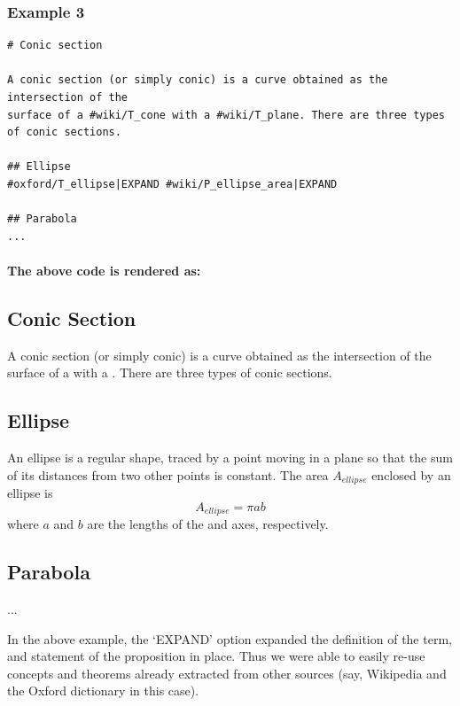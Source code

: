 \documentclass[a4paper]{article}
\begin{document}
\subsubsection*{Example 3}

\begin{verbatim}
# Conic section

A conic section (or simply conic) is a curve obtained as the intersection of the
surface of a #wiki/T_cone with a #wiki/T_plane. There are three types of conic sections.

## Ellipse
#oxford/T_ellipse|EXPAND #wiki/P_ellipse_area|EXPAND

## Parabola
...
\end{verbatim}

\paragraph{The above code is rendered as:}
\begin{mdframed}
\section*{Conic Section}
A conic section (or simply conic) is a curve obtained as the intersection of the surface of a  with a . There are three types of conic sections.

\subsection*{Ellipse}
An ellipse is a regular  shape, traced by a point moving in a plane so that the sum of its distances from two other points is constant. The area $A_{ellipse}$ enclosed by an ellipse is $$A_{ellipse} = \pi a b$$where $a$ and $b$ are the lengths of the  and  axes, respectively.

\subsection*{Parabola}
...

\end{mdframed}

In the above example, the `EXPAND' option expanded the definition of the term, and statement of the proposition in place. Thus we were able to easily re-use concepts and theorems already extracted from other sources (say, Wikipedia and the Oxford dictionary in this case).
\end{document}
